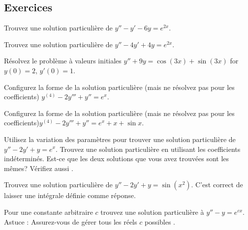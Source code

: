 \subsection{Exercices}

\begin{exercise}
	Trouvez une solution particulière de $y''-y' -6y = e^{2x}$.
\end{exercise}

\begin{exercise}
	Trouvez une solution particulière de $y''-4y' +4y = e^{2x}$.
\end{exercise}

\begin{exercise}
	Résolvez le problème à valeurs initiales
	$y''+9y = \cos (3x) + \sin (3x)$ for $y(0) = 2$, $y'(0) = 1$.
\end{exercise}

\begin{exercise}
	Configurez la forme de la solution particulière (mais ne résolvez pas 
	pour les coefficients)  $y^{(4)}-2y'''+y'' = e^x$.
\end{exercise}

\begin{exercise}
	Configurez la forme de la solution particulière (mais ne résolvez pas 
	pour les coefficients)$y^{(4)}-2y'''+y'' = e^x + x + \sin x$.
\end{exercise}

\begin{exercise}
	\pagebreak[2]
	\leavevmode
	\begin{tasks}
		\task Utilisez la variation des paramètres pour trouver une solution 
				particulière de $y''-2y'+y = e^x$.
		\task Trouvez une solution particulière en utilisant les coefficients indéterminés. 
		\task Est-ce que les deux solutions que vous avez trouvées sont les mêmes?
				Vérifiez aussi .
	\end{tasks}
\end{exercise}

\begin{exercise}
	Trouvez une solution particulière de
	$y''-2y' +y = \sin (x^2)$.  C'est correct de laisser une intégrale définie comme réponse. 
\end{exercise}

\begin{exercise}
	Pour une constante arbitraire $c$ trouvez une solution particulière à $y''-y=e^{cx}$. Astuce : Assurez-vous de gérer tous les réels $c$ possibles .
\end{exercise}

